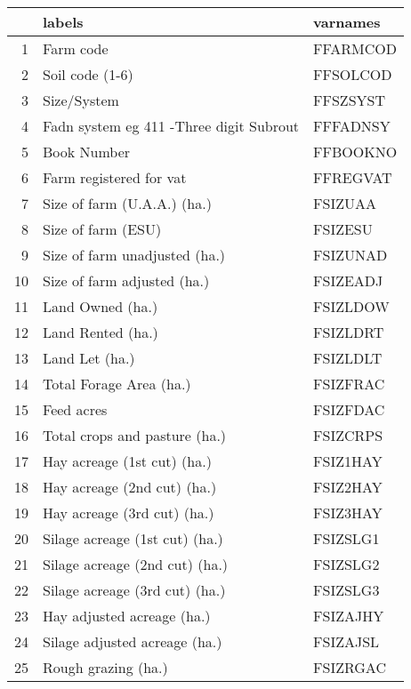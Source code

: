\documentclass{article}\usepackage{graphicx, color}
\begin{document}
\begin{flushleft}
\newpage
\begin{table}[ht]
\begin{center}
\begin{tabular}{rll}
  \hline
 & labels & varnames \\ 
  \hline
1 & Farm code & FFARMCOD \\ 
  2 & Soil code     (1-6) & FFSOLCOD \\ 
  3 & Size/System & FFSZSYST \\ 
  4 & Fadn system eg 411 -Three digit Subrout & FFFADNSY \\ 
  5 & Book Number & FFBOOKNO \\ 
  6 & Farm registered for vat & FFREGVAT \\ 
  7 & Size of farm (U.A.A.)    (ha.) & FSIZUAA \\ 
  8 & Size of farm (ESU) & FSIZESU \\ 
  9 & Size of farm unadjusted  (ha.) & FSIZUNAD \\ 
  10 & Size of farm adjusted    (ha.) & FSIZEADJ \\ 
  11 & Land Owned               (ha.) & FSIZLDOW \\ 
  12 & Land  Rented             (ha.) & FSIZLDRT \\ 
  13 & Land  Let                (ha.) & FSIZLDLT \\ 
  14 & Total Forage Area        (ha.) & FSIZFRAC \\ 
  15 & Feed acres & FSIZFDAC \\ 
  16 & Total crops and pasture  (ha.) & FSIZCRPS \\ 
  17 & Hay acreage (1st cut)    (ha.) & FSIZ1HAY \\ 
  18 & Hay acreage (2nd cut)    (ha.) & FSIZ2HAY \\ 
  19 & Hay acreage (3rd cut)    (ha.) & FSIZ3HAY \\ 
  20 & Silage acreage (1st cut) (ha.) & FSIZSLG1 \\ 
  21 & Silage acreage (2nd cut) (ha.) & FSIZSLG2 \\ 
  22 & Silage acreage (3rd cut) (ha.) & FSIZSLG3 \\ 
  23 & Hay adjusted acreage     (ha.) & FSIZAJHY \\ 
  24 & Silage adjusted acreage  (ha.) & FSIZAJSL \\ 
  25 & Rough grazing            (ha.) & FSIZRGAC \\ 

\end{tabular}
\end{center}
\end{table}
\end{flushleft}
\end{document}
